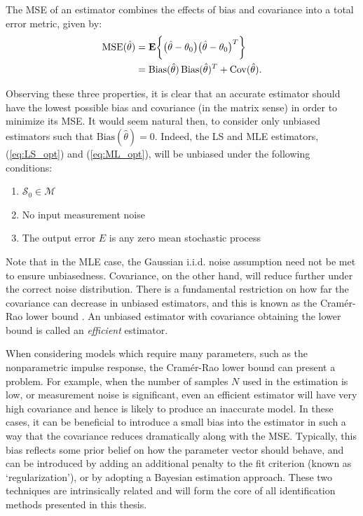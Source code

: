 \begin{defn}[MSE]
The MSE of an estimator combines the effects of bias and covariance into a total error metric, given by:
\begin{align}
\operatorname{MSE}(\hat{\theta}) &=  \textbf{E} \bigg\{ \big( \hat{\theta} - \theta_0 \big) \big( \hat{\theta} - \theta_0 \big)^T \bigg\} \\
&= \operatorname{Bias}(\hat{\theta}) \operatorname{Bias}(\hat{\theta})^T + \operatorname{Cov}(\hat{\theta}).
\end{align}
\end{defn}

Observing these three properties, it is clear that an accurate estimator should have the lowest possible bias and covariance (in the matrix sense) in order to minimize its MSE. It would seem natural then, to consider only unbiased estimators such that $\text{Bias}(\hat{\theta}) = 0$. Indeed, the LS and MLE estimators, (\ref{eq:LS_opt}) and (\ref{eq:ML_opt}), will be unbiased under the following conditions:
\begin{enumerate}
\item $\mathcal{S}_0 \in \mathcal{M}$
\item No input measurement noise
\item The output error $E$ is any zero mean stochastic process
\end{enumerate}
Note that in the MLE case, the Gaussian i.i.d. noise assumption need not be met to ensure unbiasedness. Covariance, on the other hand, will reduce further under the correct noise distribution. There is a fundamental restriction on how far the covariance can decrease in unbiased estimators, and this is known as the Cramér-Rao lower bound \cite{Pintelon2012}. An unbiased estimator with covariance obtaining the lower bound is called an \emph{efficient} estimator. 

When considering models which require many parameters, such as the nonparametric impulse response, the Cramér-Rao lower bound can present a problem. For example, when the number of samples $N$ used in the estimation is low, or measurement noise is significant, even an efficient estimator will have very high covariance and hence is likely to produce an inaccurate model. In these cases, it can be beneficial to introduce a small bias into the estimator in such a way that the covariance reduces dramatically along with the MSE. Typically, this bias reflects some prior belief on how the parameter vector should behave, and can be introduced by adding an additional penalty to the fit criterion (known as `regularization'), or by adopting a Bayesian estimation approach. These two techniques are intrinsically related and will form the core of all identification methods presented in this thesis.

